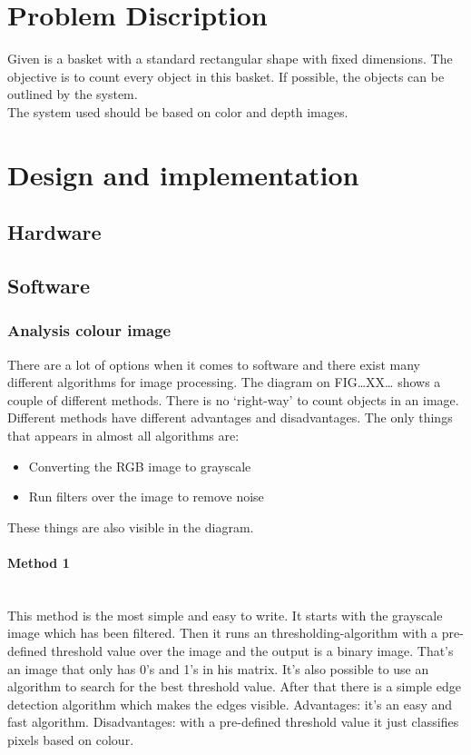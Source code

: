 \documentclass[11pt]{article}
\begin{document}
\section{Problem Discription}

\hspace{\parindent} Given is a basket with a standard rectangular shape with fixed dimensions. The objective is to count every object in this basket. If possible, the objects can be outlined by the system.\\

\noindent The system used should be based on color and depth images.


\section{Design and implementation}
\subsection{Hardware}
\subsection{Software}
\subsubsection{Analysis colour image }

There are a lot of options when it comes to software and there exist many different algorithms for image processing. The diagram on FIG…XX… shows a couple of different methods. There is no ‘right-way’ to count objects in an image. Different methods have different advantages and disadvantages. The only things that appears in almost all algorithms are:
\begin{itemize}
\item Converting the RGB image to grayscale
\item Run filters over the image to remove noise
\end{itemize}
These things are also visible in the diagram.
\paragraph{Method 1}\mbox{}\\
This method is the most simple and easy to write. It starts with the grayscale image which has been filtered. Then it runs an thresholding-algorithm with a pre-defined threshold value over the image and the output is a binary image. That’s an image that only has 0’s and 1’s in his matrix.  It’s also possible to use an algorithm to search for the best threshold value.  After that there is a simple edge detection algorithm which makes the edges visible. 
Advantages: it’s an easy and fast algorithm.
Disadvantages: with a pre-defined threshold value it just classifies pixels based on colour. 
\end{document}
